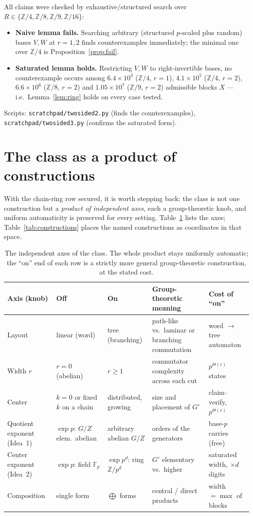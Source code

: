 \documentclass[11pt,a4paper]{article}
\theoremstyle{plain}
\theoremstyle{definition}
\newcommand{\Zp}{\mathbb{Z}}
\newcommand{\R}{R}
\newcommand{\Fp}{\mathbb{F}_p}
\begin{document}
All claims were checked by exhaustive/structured search over
$\R\in\{\Zp/4,\Zp/8,\Zp/9,\Zp/16\}$:
\begin{itemize}
\item \textbf{Naive lemma fails.} Searching arbitrary (structured $p$-scaled
  plus random) bases $V,W$ at $r=1,2$ finds counterexamples immediately;
  the minimal one over $\Zp/4$ is Proposition~\ref{prop:fail}.
\item \textbf{Saturated lemma holds.} Restricting $V,W$ to right-invertible
  bases, no counterexample occurs among $6.4\times10^{3}$ ($\Zp/4$, $r=1$),
  $4.1\times10^{5}$ ($\Zp/4$, $r=2$), $6.6\times10^{6}$ ($\Zp/8$, $r=2$)
  and $1.05\times10^{7}$ ($\Zp/9$, $r=2$) admissible blocks $X$ --- i.e.\
  Lemma~\ref{lem:ring} holds on every case tested.
\end{itemize}
Scripts: \texttt{scratchpad/twosided2.py} (finds the counterexamples),
\texttt{scratchpad/twosided3.py} (confirms the saturated form).

\section{The class as a product of constructions}
\label{sec:span}

With the chain-ring row secured, it is worth stepping back: the class is
not one construction but a \emph{product of independent axes}, each a
group-theoretic knob, and uniform automaticity is preserved for every
setting. Table~\ref{tab:axes} lists the axes; Table~\ref{tab:constructions}
places the named constructions as coordinates in that space.

\begin{table}[h]
\centering\small
\renewcommand{\arraystretch}{1.25}
\begin{tabular}{@{}p{2.0cm}p{2.5cm}p{2.4cm}p{4.4cm}p{2.7cm}@{}}
\toprule
Axis (knob) & Off & On & Group-theoretic meaning & Cost of ``on'' \\
\midrule
Layout & linear (word) & tree (branching) & path-like vs.\ laminar or
branching commutation & word $\to$ tree automaton \\
Width $r$ & $r=0$ (abelian) & $r\ge 1$ & commutator complexity across each
cut & $p^{\Theta(r)}$ states \\
Center & $k=0$ or fixed $k$ on a chain & distributed, growing & size and
placement of $G'$ & claim--verify, $p^{\Theta(r)}$ \\
Quotient exponent (Idea~1) & $\exp p$: $G/Z$ elem.\ abelian & arbitrary
abelian $G/Z$ & orders of the generators & base-$p$ carries (free) \\
Center exponent (Idea~2) & $\exp p$: field $\Fp$ & $\exp p^{d}$: ring
$\Zp/p^{d}$ & $G'$ elementary vs.\ higher & saturated width, $\times d$
digits \\
Composition & single form & $\bigoplus$ forms & central / direct products &
width $=\max$ of blocks \\
\bottomrule
\end{tabular}
\caption{The independent axes of the class. The whole product stays
uniformly automatic; the ``on'' end of each row is a strictly more general
group-theoretic construction, at the stated cost.}
\label{tab:axes}
\end{table}
\end{document}
